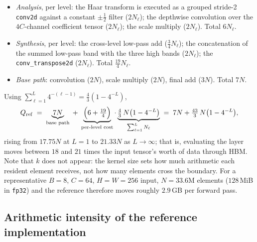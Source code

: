 \documentclass[10pt]{article} %
\newcommand{\Qio}{Q}                    %
\theoremstyle{plain}
\begin{document}
\begin{itemize}\itemsep1pt
\item \emph{Analysis}, per level: the Haar transform is executed as a grouped stride-2 \texttt{conv2d} against a constant $\pm\tfrac12$ filter ($2N_\ell$); the depthwise convolution over the $4C$-channel coefficient tensor ($2N_\ell$); the scale multiply ($2N_\ell$). Total $6N_\ell$.
\item \emph{Synthesis}, per level: the cross-level low-pass add ($\tfrac34 N_\ell$); the concatenation of the summed low-pass band with the three high bands ($2N_\ell$); the \texttt{conv\_transpose2d} ($2N_\ell$). Total $\tfrac{19}{4}N_\ell$.
\item \emph{Base path}: convolution ($2N$), scale multiply ($2N$), final add ($3N$). Total $7N$.
\end{itemize}

Using $\sum_{\ell=1}^{L}4^{-(\ell-1)}=\tfrac43(1-4^{-L})$,
\begin{equation}
\Qio_{\mathrm{ref}} \;=\; \underbrace{7N}_{\text{base path}} \;+\; \underbrace{\Bigl(6+\tfrac{19}{4}\Bigr)}_{\text{per-level cost}}\cdot\underbrace{\tfrac43\,N\bigl(1-4^{-L}\bigr)}_{\sum_{\ell=1}^L N_\ell}
\;=\; 7N + \tfrac{43}{3}\,N\bigl(1-4^{-L}\bigr),
\label{eq:qref}
\end{equation}
rising from $17.75N$ at $L=1$ to $21.33N$ as $L\to\infty$; that is, evaluating the layer moves between $18$ and $21$ times the input tensor's worth of data through HBM. Note that $k$ does not appear: the kernel size sets how much arithmetic each resident element receives, not how many elements cross the boundary. For a representative $B{=}8$, $C{=}64$, $H{=}W{=}256$ input, $N=33.6$M elements ($128$\,MiB in \texttt{fp32}) and the reference therefore moves roughly $2.9$\,GB per forward pass. 

\subsection{Arithmetic intensity of the reference implementation}
\end{document}
